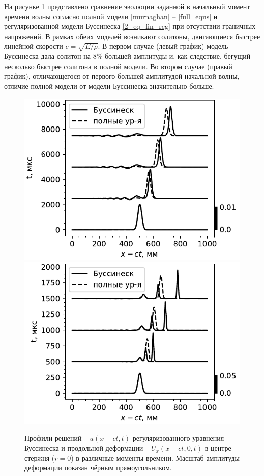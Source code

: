 \documentclass[12pt, a4paper]{article}
\begin{document}
На рисунке \ref{fig:evol_compare} представлено сравнение эволюции заданной в начальный момент времени волны согласно полной модели \eqref{murnaghan} -- \eqref{full_eqns} и регуляризованной модели Буссинеска \eqref{2_eq_fin_reg} при отсутствии граничных напряжений. В рамках обеих моделей возникают солитоны, двигающиеся быстрее линейной скорости $c=\sqrt{E/\rho}$. В первом случае (левый график) модель Буссинеска дала солитон на 8\% большей амплитуды и, как следствие, бегущий несколько быстрее солитона в полной модели. Во втором случае (правый график), отличающегося от первого большей амплитудой начальной волны, отличие полной модели от модели Буссинеска значительно больше. 
\begin{figure}[h]
	\centering
	\includegraphics[width=0.43\linewidth]{figures/SolEvolCompareSmall}
	\includegraphics[width=0.43\linewidth]{figures/SolEvolCompareSmall2}
	\caption{Профили решений $-u(x-ct, t)$ регуляризованного уравнения Буссинеска и продольной деформации $-U_x(x - ct, 0, t)$ в центре стержня ($r=0$) в различные моменты времени. Масштаб амплитуды деформации показан чёрным прямоугольником.}
	\label{fig:evol_compare}
\end{figure}
\end{document}
